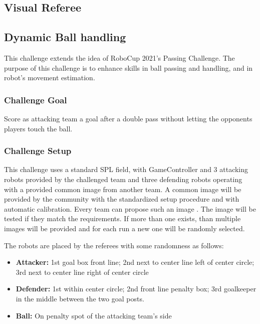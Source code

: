 \subsection{Visual Referee}


\subsection{Dynamic Ball handling}

    This challenge extends the idea of RoboCup 2021's Passing Challenge. The purpose of this challenge is to enhance skills in ball passing and handling, and in robot's movement estimation.

    \subsubsection{Challenge Goal}

    Score as attacking team a goal after a double pass without letting the opponents players touch the ball.

    \subsubsection{Challenge Setup}

    This challenge uses a standard SPL field, with GameController and 3 attacking robots provided by the challenged team and three defending robots operating with a provided common image from another team. A common image will be provided by the community with the standardized setup procedure and with automatic calibration. Every team can propose such an image . The image will be tested if they match the requirements.  If more than one exists, than multiple images will be provided and for each run a new one will be randomly selected.


    The robots are placed by the referees with some randomness as follows:
    \begin{itemize}
        \item \textbf{Attacker:} 1st goal box front line; 2nd next to center line left of center circle; 3rd next to center line right of center circle
        \item \textbf{Defender:} 1st within center circle; 2nd front line penalty box; 3rd goalkeeper in the middle between the two goal posts.
        \item \textbf{Ball:} On penalty spot of the attacking team's side 
    \end{itemize}

